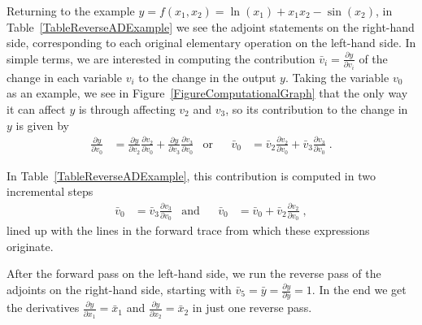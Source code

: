 \documentclass[twoside,11pt]{article}
\begin{document}
Returning to the example $y = f(x_1, x_2) = \ln(x_1) + x_1 x_2 - \sin(x_2)$, in Table~\ref{TableReverseADExample} we see the adjoint statements on the right-hand side, corresponding to each original elementary operation on the left-hand side. In simple terms, we are interested in computing the contribution $\bar{v}_i = \frac{\partial y}{\partial v_i}$ of the change in each variable $v_i$ to the change in the output $y$. Taking the variable $v_0$ as an example, we see  in Figure~\ref{FigureComputationalGraph} that the only way it can affect $y$ is through affecting $v_2$ and $v_3$, so its contribution to the change in $y$ is given by
\begin{align*}
  \frac{\partial y}{\partial v_0} &= \frac{\partial y}{\partial v_2}\frac{\partial v_2}{\partial v_0} + \frac{\partial y}{\partial v_3}\frac{\partial v_3}{\partial v_0}&
  \text{or}&&
  \bar{v}_0 &= \bar{v}_2\frac{\partial v_2}{\partial v_0} + \bar{v}_3\frac{\partial v_3}{\partial v_0}\;.
\end{align*}

In Table~\ref{TableReverseADExample}, this contribution is computed in two incremental steps
\begin{align*}
  \bar{v}_0 &= \bar{v}_3\frac{\partial v_3}{\partial v_0} &
  \text{and} &&
  \bar{v}_0 &= \bar{v}_0 + \bar{v}_2\frac{\partial v_2}{\partial v_0}\;,
\end{align*}
lined up with the lines in the forward trace from which these expressions originate.

After the forward pass on the left-hand side, we run the reverse pass of the adjoints on the right-hand side, starting with $\bar{v}_5 = \bar{y} = \frac{\partial y}{\partial y} = 1$. In the end we get the derivatives $\frac{\partial y}{\partial x_1} = \bar{x}_1$ and $\frac{\partial y}{\partial x_2} = \bar{x}_2$ in just one reverse pass.
\end{document}
